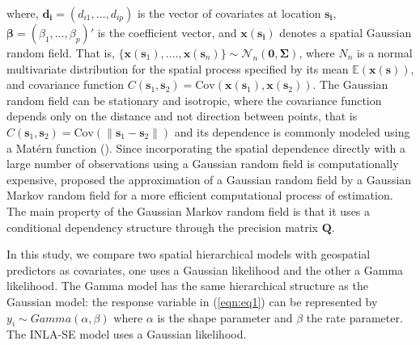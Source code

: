 \documentclass{article}
\begin{document}

where, $\boldsymbol{d_i} = (d_{i1}, \ldots, d_{ip})$ is the vector of covariates at location $\boldsymbol{s_i}$, $\boldsymbol{\beta}=(\beta_1, \ldots, \beta_p)'$ is the coefficient vector, and $\boldsymbol{x}(\boldsymbol{s_i})$ denotes a spatial Gaussian random field. That is, $\{\boldsymbol{x}(\boldsymbol{s}_{1}),...., \boldsymbol{x}(\boldsymbol{s}_{n})\} \sim \mathcal{N}_{n}(\boldsymbol{0}, \boldsymbol{\Sigma})$, where $N_{n}$ is a normal multivariate distribution for the spatial process specified by its mean $\mathbb{E}(\boldsymbol{x}(\boldsymbol{s}))$, and covariance function $C(\boldsymbol{s}_{1}, \boldsymbol{s}_{2}) = \text{Cov}(\boldsymbol{x}(\boldsymbol{s}_{1}), \boldsymbol{x}(\boldsymbol{s}_{2}))$. The Gaussian random field can be stationary and isotropic, where the covariance function depends only on the distance and not direction between points, that is $C(\boldsymbol{s}_{1}, \boldsymbol{s}_{2}) = \text{Cov}(\|\boldsymbol{s}_{1} - \boldsymbol{s}_{2}\|)$ and its dependence is commonly modeled using a Matérn function (\cite{stein2012interpolation, yuan2011models, diggleetal2013}). Since incorporating the spatial dependence directly with a large number of observations using a Gaussian random field is computationally expensive, \cite{rue2005gaussian} proposed the approximation of a Gaussian random field by a Gaussian Markov random field for a more efficient computational process of estimation. The main property of the Gaussian Markov random field is that it uses a conditional dependency structure through the precision matrix $\boldsymbol{Q}$. 




In this study, we compare two spatial hierarchical  models with geospatial predictors as covariates, one uses a Gaussian likelihood and the other a Gamma likelihood. The Gamma model has the same hierarchical structure as the Gaussian model: the response variable in (\ref{eqn:eq1}) can be represented by $y_{i} \sim Gamma(\alpha, \beta)$ where $\alpha$ is the shape parameter and $\beta$ the rate parameter. The INLA-SE model uses a Gaussian likelihood.
\end{document}
